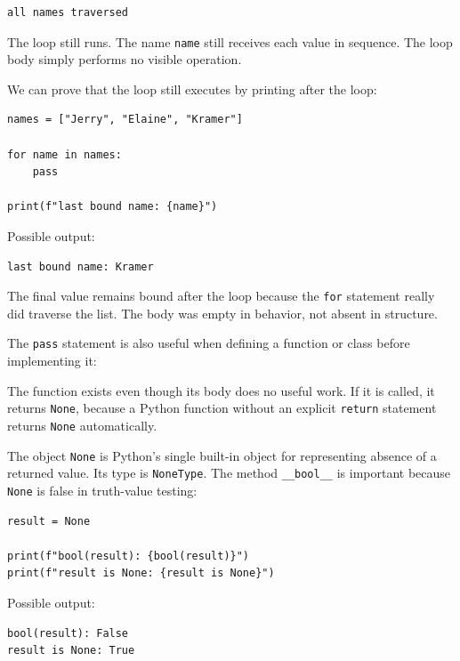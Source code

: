 \begin{verbatim}
all names traversed
\end{verbatim}

The loop still runs. The name \texttt{name} still receives each value in sequence. The loop body simply performs no visible operation.

We can prove that the loop still executes by printing after the loop:

\begin{verbatim}
names = ["Jerry", "Elaine", "Kramer"]

for name in names:
    pass

print(f"last bound name: {name}")
\end{verbatim}

Possible output:

\begin{verbatim}
last bound name: Kramer
\end{verbatim}

The final value remains bound after the loop because the \texttt{for} statement really did traverse the list. The body was empty in behavior, not absent in structure.

The \texttt{pass} statement is also useful when defining a function or class before implementing it:



The function exists even though its body does no useful work. If it is called, it returns \texttt{None}, because a Python function without an explicit \texttt{return} statement returns \texttt{None} automatically.



The object \texttt{None} is Python's single built-in object for representing absence of a returned value. Its type is \texttt{NoneType}. The method \texttt{\_\_bool\_\_} is important because \texttt{None} is false in truth-value testing:

\begin{verbatim}
result = None

print(f"bool(result): {bool(result)}")
print(f"result is None: {result is None}")
\end{verbatim}

Possible output:

\begin{verbatim}
bool(result): False
result is None: True
\end{verbatim}

